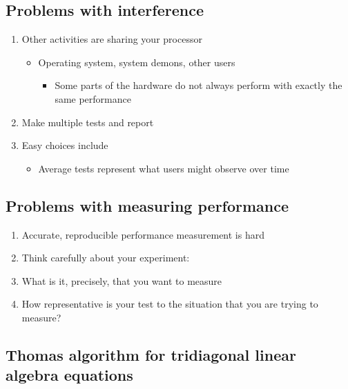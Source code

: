\documentclass[%
oneside,                 %
final,                   %
10pt]{article}
\begin{document}
\subsection{Problems with interference}
\begin{enumerate}
\item Other activities are sharing your processor
\begin{itemize}

  \item Operating system, system demons, other users
\begin{itemize}

   \item Some parts of the hardware do not always perform with exactly the same performance

\end{itemize}

\noindent
\end{itemize}

\noindent
\item Make multiple tests and report

\item Easy choices include
\begin{itemize}

  \item Average tests represent what users might observe over time
\end{itemize}

\noindent
\end{enumerate}

\noindent
\subsection{Problems with measuring performance}
\begin{enumerate}
\item Accurate, reproducible performance measurement is hard

\item Think carefully about your experiment:

\item What is it, precisely, that you want to measure

\item How representative is your test to the situation that you are trying to measure?
\end{enumerate}

\noindent
\subsection{Thomas algorithm for tridiagonal linear algebra equations}
\end{document}
